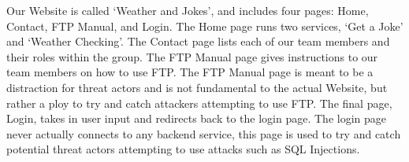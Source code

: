 
Our Website is called ‘Weather and Jokes’, and includes four pages: Home, Contact, FTP Manual, and Login. The Home page runs two services, ‘Get a Joke’ and ‘Weather Checking’. The Contact page lists each of our team members and their roles within the group. The FTP Manual page gives instructions to our team members on how to use FTP. The FTP Manual page is meant to be a distraction for threat actors and is not fundamental to the actual Website, but rather a ploy to try and catch attackers attempting to use FTP. The final page, Login, takes in user input and redirects back to the login page. The login page never actually connects to any backend service, this page is used to try and catch potential threat actors attempting to use attacks such as SQL Injections.
